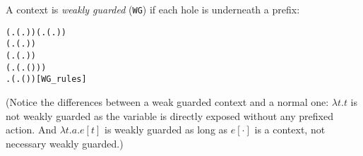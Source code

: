 A context is \emph{weakly guarded} (\texttt{WG}) if each hole is
underneath a prefix:
\begin{alltt}
\HOLTokenTurnstile{} (\HOLSymConst{\HOLTokenForall{}}.  (\HOLTokenLambda{}. )) \HOLSymConst{\HOLTokenConj{}} (\HOLSymConst{\HOLTokenForall{}} .   \HOLSymConst{\HOLTokenImp{}}  (\HOLTokenLambda{}.  )) \HOLSymConst{\HOLTokenConj{}}
   (\HOLSymConst{\HOLTokenForall{}} .   \HOLSymConst{\HOLTokenConj{}}   \HOLSymConst{\HOLTokenImp{}}  (\HOLTokenLambda{}.   \HOLSymConst{\ensuremath{+}}  )) \HOLSymConst{\HOLTokenConj{}}
   (\HOLSymConst{\HOLTokenForall{}} .   \HOLSymConst{\HOLTokenConj{}}   \HOLSymConst{\HOLTokenImp{}}  (\HOLTokenLambda{}.   \HOLSymConst{\ensuremath{\parallel}}  )) \HOLSymConst{\HOLTokenConj{}}
   (\HOLSymConst{\HOLTokenForall{}} .   \HOLSymConst{\HOLTokenImp{}}  (\HOLTokenLambda{}. \HOLSymConst{\ensuremath{\nu}}  ( ))) \HOLSymConst{\HOLTokenConj{}}
   \HOLSymConst{\HOLTokenForall{}} .   \HOLSymConst{\HOLTokenImp{}}  (\HOLTokenLambda{}.  ( ) )\hfill{[WG_rules]}
\end{alltt}
(Notice the differences between a weak guarded context and a normal
one: $\lambda t. t$ is not weakly guarded as the variable is directly
exposed without any prefixed action. And $\lambda t. a.e[t]$ is weakly
guarded as long as $e[\cdot]$ is a context, not necessary weakly guarded.)

